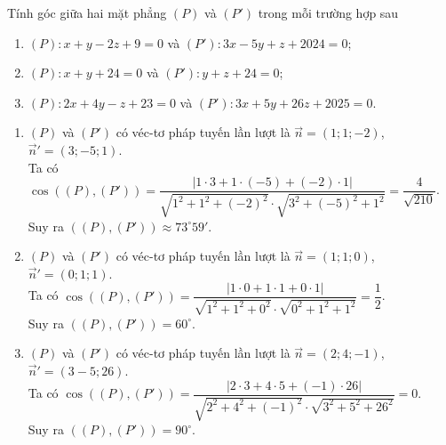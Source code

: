 \begin{vd}%
	Tính góc giữa hai mặt phẳng $(P)$ và $(P')$ trong mỗi trường hợp sau
	\begin{enumerate}
		\item $(P)\colon x+y-2z+9=0$ và $(P')\colon 3x-5y+z+2024=0$;
		\item $(P)\colon x+y+24=0$ và $(P')\colon y+z+24=0$;
		\item $(P)\colon 2x+4y-z+23=0$ và $(P')\colon 3x+5y+26z+2025=0$.
	\end{enumerate}
	\loigiai
	{
		\begin{enumerate}
			\item $(P)$ và $(P')$ có véc-tơ pháp tuyến lần lượt là $\overrightarrow{n}=(1;1;-2)$, $\overrightarrow{n}'=(3;-5;1)$.\\
			Ta có $\cos\left ((P),(P') \right )=\dfrac{\left |1\cdot 3+1\cdot (-5)+(-2)\cdot 1 \right |}{\sqrt{1^2+1^2+(-2)^2}\cdot\sqrt{3^2+(-5)^2+1^2}}=\dfrac{4}{\sqrt{210}}$.\\
			Suy ra $((P),(P'))\approx 73^{\circ}59'$.
			\item $(P)$ và $(P')$ có véc-tơ pháp tuyến lần lượt là $\overrightarrow{n}=(1;1;0)$, $\overrightarrow{n}'=(0;1;1)$.\\
			Ta có $\cos\left ((P),(P') \right )=\dfrac{\left |1\cdot 0+1\cdot 1+0\cdot 1 \right |}{\sqrt{1^2+1^2+0^2}\cdot\sqrt{0^2+1^2+1^2}}=\dfrac{1}{2}$.\\
			Suy ra $((P),(P'))=60^{\circ}$.
			\item $(P)$ và $(P')$ có véc-tơ pháp tuyến lần lượt là $\overrightarrow{n}=(2;4;-1)$, $\overrightarrow{n}'=(3-5;26)$.\\
			Ta có $\cos\left ((P),(P') \right )=\dfrac{\left |2\cdot 3+4\cdot 5+(-1)\cdot 26 \right |}{\sqrt{2^2+4^2+(-1)^2}\cdot\sqrt{3^2+5^2+26^2}}=0$.\\
			Suy ra $((P),(P'))=90^{\circ}$.
		\end{enumerate}
	}
\end{vd}

